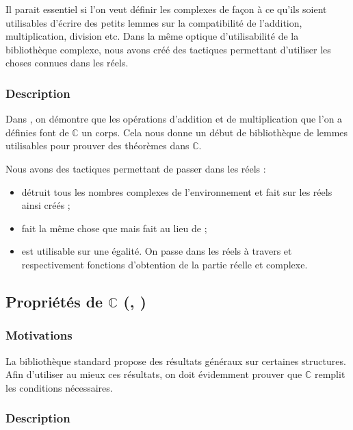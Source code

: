 Il parait essentiel si l'on veut définir les complexes de façon à ce qu'ils soient utilisables d'écrire des petits lemmes sur la compatibilité de l'addition, multiplication, division etc. Dans la même optique d'utilisabilité de la bibliothèque complexe, nous avons créé des tactiques permettant d'utiliser les choses connues dans les réels.

\subsubsection{Description}

Dans , on démontre que les opérations d'addition et de multiplication que l'on a définies font de $\mathbb{C}$ un corps. Cela nous donne un début de bibliothèque de lemmes utilisables pour prouver des théorèmes dans $\mathbb{C}$.

Nous avons des tactiques permettant de passer dans les réels : 
\begin{itemize}
 \item {} détruit tous les nombres complexes de l'environnement et fait  sur les réels ainsi créés ;
 \item {} fait la même chose que  mais fait  au lieu de  ;
 \item {} est utilisable sur une égalité. On passe dans les réels à travers  et  respectivement fonctions d'obtention de la partie réelle et complexe.
\end{itemize}

\subsection{Propriétés de $\mathbb{C}$ (, )}

\subsubsection{Motivations}

La bibliothèque standard propose des résultats généraux sur certaines structures. Afin d'utiliser au mieux ces résultats, on doit évidemment prouver que $\mathbb{C}$ remplit les conditions nécessaires.

\subsubsection{Description}

